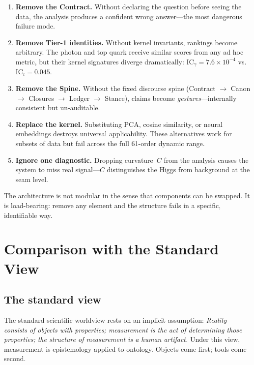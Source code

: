 \documentclass[
  aps,
  prd,
  twocolumn,
  superscriptaddress,
  nofootinbib,
  floatfix
]{revtex4-2}
\newcommand{\IC}{\mathrm{IC}}
\begin{document}
\begin{enumerate}[leftmargin=*,label=(\roman*)]
\item \textbf{Remove the Contract.}  Without declaring the question
  before seeing the data, the analysis produces a confident wrong
  answer---the most dangerous failure mode.

\item \textbf{Remove Tier-1 identities.}  Without kernel invariants,
  rankings become arbitrary.  The photon and top quark receive similar
  scores from any ad hoc metric, but their kernel signatures diverge
  dramatically: $\IC_\gamma = 7.6 \times 10^{-4}$ vs.\
  $\IC_t = 0.045$.

\item \textbf{Remove the Spine.}  Without the fixed discourse
  spine (Contract $\to$ Canon $\to$ Closures $\to$ Ledger $\to$
  Stance), claims become \emph{gestures}---internally consistent
  but un-auditable.

\item \textbf{Replace the kernel.}  Substituting PCA, cosine
  similarity, or neural embeddings destroys universal applicability.
  These alternatives work for subsets of data but fail across the
  full 61-order dynamic range.

\item \textbf{Ignore one diagnostic.}  Dropping curvature~$C$ from
  the analysis causes the system to miss real signal---$C$
  distinguishes the Higgs from background at the seam level.
\end{enumerate}

\noindent The architecture is not modular in the sense that components
can be swapped.  It is load-bearing: remove any element and the
structure fails in a specific, identifiable way.

\section{Comparison with the Standard View}\label{sec:differs}

\subsection{The standard view}

The standard scientific worldview rests on an implicit assumption:
\emph{Reality consists of objects with properties; measurement is the
act of determining those properties; the structure of measurement is a
human artifact.}  Under this view, measurement is epistemology applied
to ontology.  Objects come first; tools come second.
\end{document}
